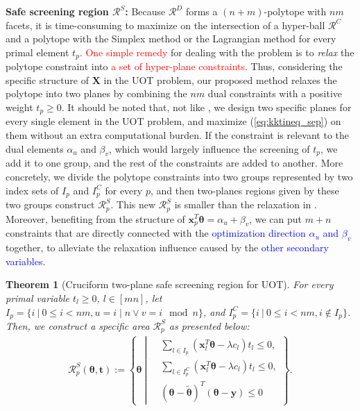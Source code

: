 \documentclass[twoside]{article}
\theoremstyle{plain}
\newtheorem{thm}{Theorem}
\newcommand{\mat}[1]{\mathbf{#1}}
\renewcommand{\vec}[1]{\bm{#1}}
\newcommand{\changeHK}[1]{\textcolor{red}{#1}}
\newcommand{\changeXS}[1]{\textcolor{blue}{#1}}
\begin{document}
{\bf Safe screening region $\mathcal{R}^S$:} 
Because $\mathcal{R}^D$ forms a $(n+m)$-polytope with $nm$ facets, it is time-consuming to maximize on the intersection of a hyper-ball $\mathcal{R}^{C}$ and a polytope with the Simplex method or the Lagrangian method for every primal element $t_p$. \changeHK{One simple remedy} for dealing with the problem is to {\it relax} the polytope constraint into \changeHK{a set of hyper-plane constraints}. Thus, considering the specific structure of $\mat X$ in the UOT problem, our proposed method relaxes the polytope into two planes by combining the $nm$ dual constraints with a positive weight $t_p \geq 0$. It should be noted that, not like \citep{7469344}, we design two specific planes for every single element in the UOT problem, and maximize (\ref{eq:kktineq_sep}) on them without an extra computational burden. If the constraint is relevant to the dual elements $\alpha_u$ and $\beta_v$, which would largely influence the screening of $t_p$, we add it to one group, and the rest of the constraints are added to another. 
%
More concretely, we divide the polytope constraints into two groups represented by two index sets of $I_p$ and ${I}^{C}_p$ for every $p$, and then two-planes regions given by these two groups construct $\mathcal{R}^S_{p}$. This new $\mathcal{R}^S_{p}$ is smaller than the relaxation in \citep{Yamada_NIPS_2021}. Moreover, benefiting from the structure of $\vec{x}_p^T\vec{\theta} = {\alpha}_{u} + {\beta}_{v}$, we can put $m+n$ constraints that are directly connected with the \changeXS{optimization direction $\alpha_u$ and $\beta_v$} together, to alleviate the relaxation influence caused by the \changeXS{other secondary variables.}

\begin{thm}[Cruciform two-plane safe screening region for UOT]
\label{Thm:AreaScreeningUOT}
For every primal variable $t_l \geq  0$, $l \in [mn]$, let $I_p = \{ i \ | \  0\leq i<nm, u = i\mid n \vee v = i\mod n\}$, and ${I}^{C}_p = \{ i \ | \  0\leq i<nm, i \notin I_p\}$. Then, we construct a specific area $\mathcal{R}^{S}_{p}$ as presented below:
\begin{equation}
\label{Eq:FinalRS}
\begin{split} 
\mathcal{R}^S_{p}(\vec{\theta}, \vec{t}):= \left\{\vec{\theta} \ \left|\ 
\begin{aligned}
 &\sum_{l\in I_p}(\vec{x}_{l}^{T}\vec{\theta} - \lambda {c}_l)t_l\leq 0, \\
 &\sum_{l\in {I}^{C}_p}(\vec{x}_{l} ^{T}\vec{\theta}- \lambda {c}_l)t_l\leq 0, \\
  &(\vec{\theta}-\tilde{\vec{\theta}})^T(\vec{\theta}-\vec{y})\leq 0
\end{aligned}
\right.
\right\}.
\end{split}
\end{equation}
\end{thm}
\end{document}
